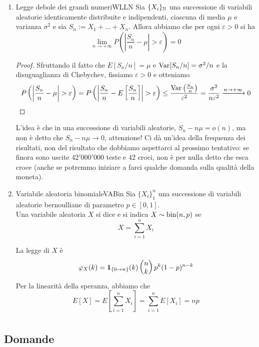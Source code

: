 \documentclass{article}
\begin{document}
\begin{enumerate}
    \item 
    \begin{theorem}{Legge debole dei grandi numeri}{WLLN}
        Sia $\{X_i\}_{\mathbb{N}}$ una successione di variabili aleatorie identicamente distribuite e indipendenti, ciascuna di media $\mu$ e varianza $\sigma^2$ e sia $S_n := X_1+...+X_n$. Allora abbiamo che per ogni $\varepsilon>0$ si ha
        \[\lim_{n\to +\infty} P\left(\left| \frac{S_n}{n} - \mu \right|> \varepsilon\right)=0\] 
    \end{theorem}
    \begin{proof}
        Sfruttando il fatto che $E[S_n/n] = \mu$ e $\operatorname{Var}[S_n/n] = \sigma^2/n$ e la disuguaglianza di Chebychev, fissiamo $\varepsilon>0$ e otteniamo
        \[P\left(\left| \frac{S_n}{n} - \mu \right|> \varepsilon\right) = P\left(\left| \frac{S_n}{n} - E\left[\frac{S_n}{n}\right] \right|> \varepsilon\right)\le \frac{\Var\left(\frac{S_n}{n}\right)}{\varepsilon^2} = \frac{\sigma^2}{n\varepsilon^2}\xrightarrow{n\to+\infty} 0\]
    \end{proof}
    L'idea è che in una successione di variabili aleatorie, $S_n-n\mu = o(n)$, ma non è detto che $S_n - n\mu \to 0$, attenzione! Ci dà un'idea della frequenza dei risultati, non del risultato che dobbiamo aspettarci al prossimo tentativo: se finora sono uscite $42'000'000$ teste e $42$ croci, non è per nulla detto che esca croce (anche se potremmo iniziare a farci qualche domanda sulla qualità della moneta).
    \item 
    \begin{definition}{Variabile aleatoria binomiale}{VABin}
        Sia $\{X_i\}_1^n$ una successione di variabili aleatorie bernoulliane di parametro $p\in [0,1]$.\\
        Una variabile aleatoria $X$ si dice  e si indica $X\sim\operatorname{bin}(n,p)$ se
        \[X = \sum_{i=1}^n X_i\]
    \end{definition}
    La legge di $X$ è 
    \[\varphi_X(k) = \mathbf{1}_{\{0\to n\}}(k)\begin{pmatrix} n \\ k \end{pmatrix} p^k(1-p)^{n-k}\]
    Per la linearità della speranza, abbiamo che 
    \[E[X] = E\left[\sum_{i=1}^n X_i\right] = \sum_{i=1}^n E[X_i] = np\]
\end{enumerate}

\section{}%

\subsection*{Domande}
\end{document}
